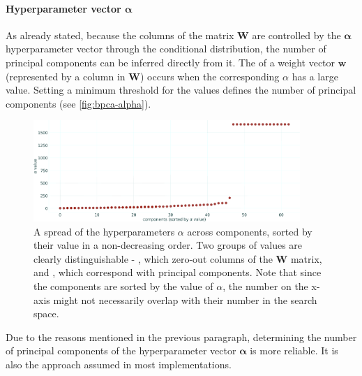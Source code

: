 


\paragraph{Hyperparameter vector $\boldsymbol{\alpha}$}\label{par:bpca-components-alpha}
As already stated, because the columns of the matrix $\mathbf{W}$ are controlled by the $\mathbf{\alpha}$ hyperparameter vector through the conditional distribution, the number of principal components can be inferred directly from it. The  of a weight vector $\mathbf{w}$ (represented by a column in $\mathbf{W}$) occurs when the corresponding $\alpha$ has a large value. Setting a minimum threshold for the values defines the number of principal components (see \autoref{fig:bpca-alpha}).

\begin{figure}[h]
    \centering
    \includegraphics[width=0.9\textwidth]{observational/img/bpca/bpca_alpha.png}
    \caption[Spread of BPCA $\alpha$ hyperparameters]{A spread of the hyperparameters $\alpha$ across components, sorted by their value in a non-decreasing order. Two groups of values are clearly distinguishable - , which zero-out columns of the $\mathbf{W}$ matrix, and , which correspond with principal components. Note that since the components are sorted by the value of $\alpha$, the number on the x-axis might not necessarily overlap with their number in the search space.}
    \label{fig:bpca-alpha}
\end{figure}

\vspace{\baselineskip}
Due to the reasons mentioned in the previous paragraph, determining the number of principal components of the hyperparameter vector $\boldsymbol{\alpha}$ is more reliable. It is also the approach assumed in most implementations.

